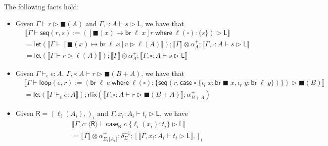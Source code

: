 \documentclass[acmsmall,screen,review]{acmart}
\newcommand{\ms}[1]{\ensuremath{\mathsf{#1}}}
\newcommand{\lto}{:}
\newcommand{\linl}[1]{\iota_l\;{#1}}
\newcommand{\linr}[1]{\iota_r\;{#1}}
\newcommand{\brb}[2]{\ms{br}\;#1\;#2}
\newcommand{\casestmt}[5]{\ms{case}\;#1\;\{\linl{#2} \lto #3, \linr{#4} \lto #5\}}
\newcommand{\where}[2]{#1\;\ms{where}\;#2}
\newcommand{\wbranch}[3]{#1(#2) \lto \{#3\}}
\newcommand{\bhyp}[2]{#1 : #2}
\newcommand{\hasty}[4]{#1 \vdash_{#2} #3: {#4}}
\newcommand{\haslb}[3]{#1 \vdash #2 \rhd #3}
\newcommand{\dnt}[1]{\llbracket{#1}\rrbracket}
\newcommand{\lmor}[1]{\ms{let}(#1)}
\newcommand{\rfix}[1]{\ms{rfix}(#1)}
\newcommand{\invar}{\square}
\newcommand{\outlb}{\blacksquare}
\newcommand{\pckd}[1]{\langle #1 \rangle}
\begin{document}
\begin{lemma}
  The following facts hold:
  \begin{itemize}
    \item Given $\haslb{\Gamma}{r}{\outlb(A)}$ and $\haslb{\Gamma, \bhyp{\invar}{A}}{s}{\ms{L}}$,
    we have that
    \begin{equation}
      \begin{aligned}
      & \dnt{\haslb{\Gamma}{\ms{seq}(r, s) 
        := (\where{[\outlb(x) \mapsto \brb{\ell}{x}]r}{\wbranch{\ell}{\invar}{s}})}{\ms{L}}} \\
      & = \lmor{\dnt{\haslb{\Gamma}{[\outlb(x) \mapsto \brb{\ell}{x}]r}{\ell(A)}}} 
        ; \dnt{\Gamma} \otimes \alpha^+_A 
        ; \dnt{\haslb{\Gamma, \bhyp{\invar}{A}}{s}{\ms{L}}} \\
      & = \lmor{\dnt{\haslb{\Gamma}{r}{\ell(A)}}} 
        ; \dnt{\Gamma} \otimes \alpha^+_A 
        ; \dnt{\haslb{\Gamma, \bhyp{\invar}{A}}{s}{\ms{L}}}
      \end{aligned}
    \end{equation}
    \item Given $\hasty{\Gamma}{\epsilon}{e}{A}$, %
                $\haslb{\Gamma, \bhyp{\invar}{A}}{r}{\outlb(B + A)}$,
    we have that
    \begin{equation}
      \begin{aligned}
      & \dnt{\haslb{\Gamma}{\ms{loop}(e, r) 
        := (\where{\brb{\ell}{e}}{\wbranch{\ell}{\invar}
        {\ms{seq}(r, \casestmt{\invar}{x}{\brb{\outlb}{x}}{y}{\brb{\ell}{y}})}})}{\outlb(B)}} \\
      & = \lmor{\dnt{\hasty{\Gamma}{\epsilon}{e}{A}}}
        ; \rfix{\dnt{\haslb{\Gamma, \bhyp{\invar}{A}}{r}{\outlb(B + A)}} ; \alpha^+_{B + A}}
      \end{aligned}
    \end{equation}
    \item Given $\ms{R} = (\ell_i(A_i),)_i$ and $\haslb{\Gamma, \bhyp{x_i}{A_i}}{t_i}{\ms{L}}$, we
    have
    \begin{equation}
      \begin{aligned}
        & \dnt{
          \haslb{\Gamma, \bhyp{c}{\pckd{\ms{R}}}}{\ms{case}_{\ms{R}}\;c\; \{\ell_i(x_i) : t_i\}}
                {\ms{L}}
          } \\
        & = \dnt{\Gamma} \otimes \alpha^+_{\Sigma_i\dnt{A_i}} ; \delta^{-1}_{\Sigma}
          ; [\dnt{\haslb{\Gamma, \bhyp{x_i}{A_i}}{t_i}{\ms{L}}},]_i
      \end{aligned}
    \end{equation}

\end{itemize}
\end{lemma}
\end{document}
